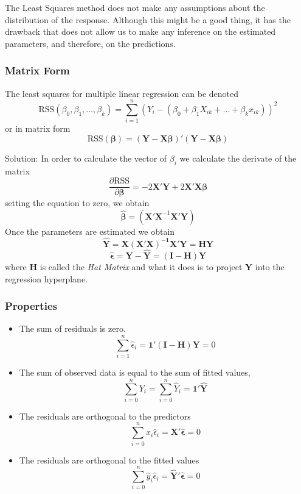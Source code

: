 The Least Squares method does not make any assumptions about the distribution
of the response. Although this might be a good thing, it has the drawback that
does not allow us to make any inference on the estimated parameters, and
therefore, on the predictions.

\subsubsection{Matrix Form}
The least squares for multiple linear regression can be denoted 
\begin{equation}
    \text{RSS}(\beta_0,\beta_1,\dots,\beta_k) = \sum_{i=1}^n (Y_i - (\beta_0 + \beta_1 X_{ik} + \dots + \beta_k x_{ik}))^2
\end{equation}
or in matrix form
\begin{equation}
    \text{RSS}(\bm{\beta}) = (\bm{Y}-\bm{X\beta})'(\bm{Y}-\bm{X\beta})
\end{equation}

\begin{tcolorbox}
Solution: In order to calculate the vector of $\beta_i$ we calculate the
derivate of the matrix
\begin{equation*}
    \frac{\partial \text{RSS}}{\partial\bm{\beta}} = -2\bm{X'Y} + 2\bm{X'X\beta}
\end{equation*}
setting the equation to zero, we obtain
\begin{equation*}
    \bm{\hat{\beta}} = (\bm{X'X}^{-1} \bm{X'Y})
\end{equation*}
Once the parameters are estimated we obtain
\begin{equation}
    \bm{\hat{Y}} = \bm{X(X'X)^{-1}X'Y} = \bm{HY}
\end{equation}
\begin{equation}
    \bm{\hat{\epsilon}} = \bm{Y-\hat{Y}} = \bm{(I-H)Y}
\end{equation}
where $\bm{H}$ is called the \textit{Hat Matrix} and what it does is to project $\bm{Y}$ into the regression hyperplane.
\end{tcolorbox}

\subsubsection{Properties}
\begin{itemize}
    \item The sum of residuals is zero.
    \[ \sum_{i=1}^n \hat{\epsilon}_i = \bm{1'(I-H)Y} = 0 \]
    \item The sum of observed data is equal to the sum of fitted values,
    \[ \sum_{i=0}^n Y_i = \sum_{i=0}^n \hat{Y}_i = \bm{1'\hat{Y}} \]
    \item The residuals are orthogonal to the predictors
    \[ \sum_{i=0}^n x_i\hat{\epsilon}_i = \bm{X'\hat{\epsilon}} = 0 \]
    \item The residuals are orthogonal to the fitted values
    \[ \sum_{i=0}^n \hat{y}_i\hat{\epsilon}_i = \bm{\hat{Y}'\hat{\epsilon}} = 0 \]
\end{itemize}

